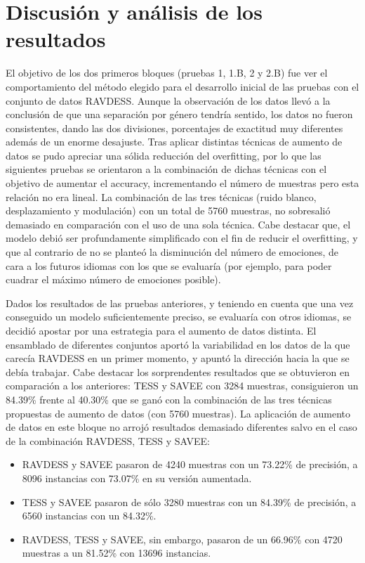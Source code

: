 \documentclass[11pt,a4paper,spanish]{book}
\begin{document}
	\chapter{Discusión y análisis de los resultados}
	
	El objetivo de los dos primeros bloques (pruebas 1, 1.B, 2 y 2.B) fue ver el comportamiento del método elegido para el desarrollo inicial de las pruebas con el conjunto de datos RAVDESS. Aunque la observación de los datos llevó a la conclusión de que una separación por género tendría sentido, los datos no fueron consistentes, dando las dos divisiones, porcentajes de exactitud muy diferentes además de un enorme desajuste. Tras aplicar distintas técnicas de aumento de datos se pudo apreciar una sólida reducción del overfitting, por lo que las siguientes pruebas se orientaron a la combinación de dichas técnicas con el objetivo de aumentar el accuracy, incrementando el número de muestras pero esta relación no era lineal. La combinación de las tres técnicas (ruido blanco, desplazamiento y modulación) con un total de 5760 muestras, no sobresalió demasiado en comparación con el uso de una sola técnica. 
	Cabe destacar que, el modelo debió ser profundamente simplificado con el fin de reducir el overfitting, y que al contrario de \cite{Mustaqeem2020} no se planteó la disminución del número de emociones, de cara a los futuros idiomas con los que se evaluaría (por ejemplo, para poder cuadrar el máximo número de emociones posible).
	
	Dados los resultados de las pruebas anteriores, y teniendo en cuenta que una vez conseguido un modelo suficientemente preciso, se evaluaría con otros idiomas, se decidió apostar por una estrategia para el aumento de datos distinta. El ensamblado de diferentes conjuntos aportó la variabilidad en los datos de la que carecía RAVDESS en un primer momento, y apuntó la dirección hacia la que se debía trabajar.
	Cabe destacar los sorprendentes resultados que se obtuvieron en comparación a los anteriores: TESS y SAVEE con 3284 muestras, consiguieron un 84.39\% frente al 40.30\%  que se ganó con la combinación de las tres técnicas propuestas de aumento de datos (con 5760 muestras). La aplicación de aumento de datos en este bloque no arrojó resultados demasiado diferentes salvo en el caso de la combinación RAVDESS, TESS y SAVEE:
	\begin{itemize}
		\item RAVDESS y SAVEE pasaron de 4240 muestras con un 73.22\% de precisión, a 8096 instancias con 73.07\% en su versión aumentada.
		
		\item TESS y SAVEE pasaron de sólo 3280 muestras con un 84.39\% de precisión, a 6560 instancias con un 84.32\%.
		
		\item RAVDESS, TESS y SAVEE, sin embargo, pasaron de un 66.96\% con 4720 muestras a un 81.52\% con 13696 instancias.
	\end{itemize}
	
\end{document}
